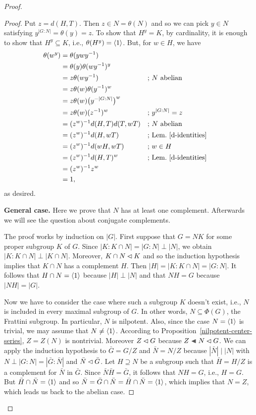 \begin{solution}
\begin{proof}
\begin{proof}
    Put $z=d(H,T)$. Then $z\in N=\theta(N)$ and so we can pick $y\in N$ satisfying $y^{|G:N|}=\theta(y)=z$. To show that $H^y=K$, by cardinality, it is enough to show that $H^y\subseteq K$, i.e., $\theta(H^y)=\langle1\rangle$. But, for $w\in H$, we have
    \begin{align*}
        \theta(w^y) &= \theta(ywy^{-1})\\
            &= \theta(y)\theta(wy^{-1})^y\\
            &= z\theta(wy^{-1})   &&\text{; $N$ abelian}\\
            &= z\theta(w)\theta(y^{-1})^w\\
            &= z\theta(w)\big(y^{-|G:N|}\big)^w\\
            &= z\theta(w)(z^{-1})^w &&\text{; }y^{|G:N|}=z\\
            &= (z^w)^{-1}d(H,T)d(T,wT)  &&\text{; $N$ abelian}\\
            &= (z^w)^{-1}d(H,wT)    &&\text{; Lem.~\ref{d-identities}}\\
            &= (z^w)^{-1}d(wH,wT)   &&\text{; }w\in H\\
            &= (z^w)^{-1}d(H,T)^w    &&\text{; Lem.~\ref{d-identities}}\\
            &= (z^w)^{-1}z^w\\
            &= 1,
    \end{align*}
    as desired.

    \textbf{General case.} Here we prove that $N$ has at least one complement. Afterwards we will see the question about conjugate complements.
    
    The proof works by induction on $|G|$. First suppose that $G=NK$ for some proper subgroup $K$ of $G$. Since $|K:K\cap N|=|G:N|\perp|N|$, we obtain $|K:K\cap N|\perp|K\cap N|$. Moreover, $K\cap N\lhd K$ and so the induction hypothesis implies that $K\cap N$ has a complement $H$. Then $|H|=|K:K\cap N|=|G:N|$. It follows that $H\cap N=\langle1\rangle$ because $|H|\perp|N|$ and that $NH=G$ because $|NH|=|G|$.
    
    Now we have to consider the case where such a subgroup $K$ doesn't exist, i.e., $N$ is included in every maximal subgroup of $G$. In other words, $N\subseteq\Phi(G)$, the Frattini subgroup. In particular, $N$ is nilpotent. Also, since the case $N=\langle1\rangle$ is trivial, we may assume that $N\ne\langle1\rangle$. According to Proposition~\ref{nilpotent-center-series}, $Z=Z(N)$ is nontrivial. Moreover $Z\lhd G$ because $Z\ch N\normal G$. We can apply the induction hypothesis to $\bar G=G/Z$ and $\bar N=N/Z$ because $|\bar N|\mid|N|$ with $N\perp|G:N|=|\bar G:\bar N|$ and $\bar N\lhd\bar G$. Let $H\supseteq N$ be a subgroup such that $\bar H=H/Z$ is a complement for $\bar N$ in $\bar G$. Since $\bar N\bar H=\bar G$, it follows that $NH=G$, i.e., $H=G$. But $\bar H\cap\bar N=\langle1\rangle$ and so $\bar N=\bar G\cap\bar N=\bar H\cap \bar N=\langle1\rangle$, which implies that $N=Z$, which leads us back to the abelian case.


\end{proof}
\end{proof}
\end{solution}
